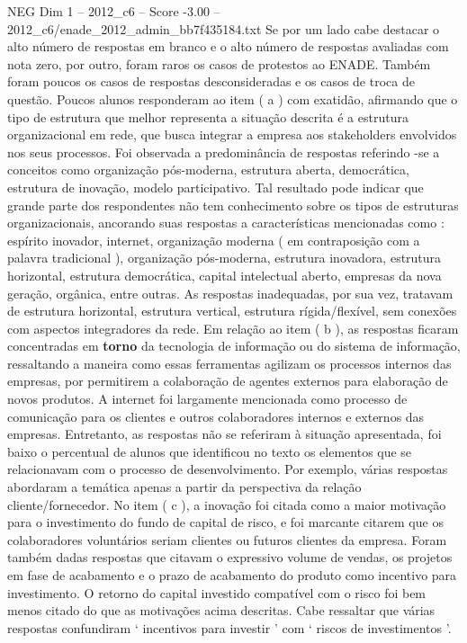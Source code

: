 \begin{textsample}{NEG Dim 1 – 2012\_c6 – Score -3.00 – 2012\_c6/enade\_2012\_admin\_bb7f435184.txt}
Se por um lado cabe destacar o alto número de respostas em branco e o alto número de respostas avaliadas com nota zero, por outro, foram raros os casos de protestos ao ENADE.
Também foram poucos os casos de respostas desconsideradas e os casos de troca de questão.
Poucos alunos responderam ao item ( a ) com exatidão, afirmando que o tipo de estrutura que melhor representa a situação descrita é a estrutura organizacional em rede, que busca integrar a empresa aos stakeholders envolvidos nos seus processos.
Foi observada a predominância de respostas referindo -se a conceitos como organização pós-moderna, estrutura aberta, democrática, estrutura de inovação, modelo participativo.
Tal resultado pode indicar que grande parte dos respondentes não tem conhecimento sobre os tipos de estruturas organizacionais, ancorando suas respostas a características mencionadas como : espírito inovador, internet, organização moderna ( em contraposição com a palavra tradicional ), organização pós-moderna, estrutura inovadora, estrutura horizontal, estrutura democrática, capital intelectual aberto, empresas da nova geração, orgânica, entre outras.
As respostas inadequadas, por sua vez, tratavam de estrutura horizontal, estrutura vertical, estrutura rígida/flexível, sem conexões com aspectos integradores da rede.
Em relação ao item ( b ), as respostas ficaram concentradas em \textbf{torno} da tecnologia de informação ou do sistema de informação, ressaltando a maneira como essas ferramentas agilizam os processos internos das empresas, por permitirem a colaboração de agentes externos para elaboração de novos produtos.
A internet foi largamente mencionada como processo de comunicação para os clientes e outros colaboradores internos e externos das empresas.
Entretanto, as respostas não se referiram à situação apresentada, foi baixo o percentual de alunos que identificou no texto os elementos que se relacionavam com o processo de desenvolvimento.
Por exemplo, várias respostas abordaram a temática apenas a partir da perspectiva da relação cliente/fornecedor.
No item ( c ), a inovação foi citada como a maior motivação para o investimento do fundo de capital de risco, e foi marcante citarem que os colaboradores voluntários seriam clientes ou futuros clientes da empresa.
Foram também dadas respostas que citavam o expressivo volume de vendas, os projetos em fase de acabamento e o prazo de acabamento do produto como incentivo para investimento.
O retorno do capital investido compatível com o risco foi bem menos citado do que as motivações acima descritas.
Cabe ressaltar que várias respostas confundiram ‘ incentivos para investir ’ com ‘ riscos de investimentos ’.

\end{textsample}
